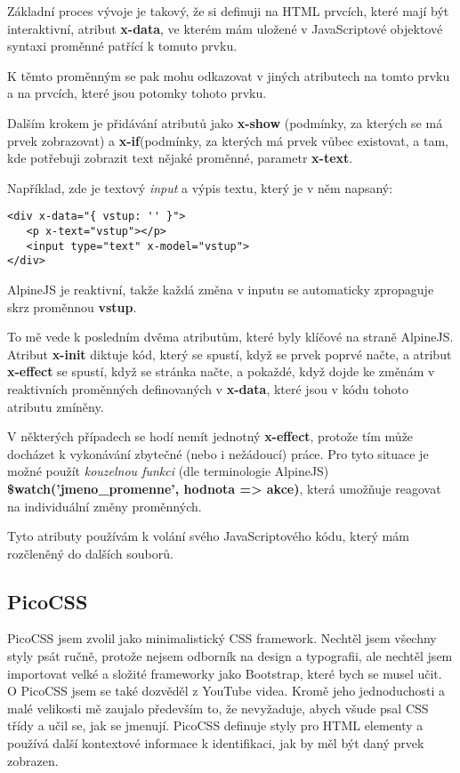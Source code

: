 \documentclass[11pt,a4paper,twoside,openright]{report}
\begin{document}
Základní proces vývoje je takový, že si definuji na HTML prvcích, které mají být interaktivní,
atribut \textbf{x-data}, ve kterém mám uložené v JavaScriptové objektové syntaxi proměnné patřící
k tomuto prvku.

K těmto proměnným se pak mohu odkazovat v jiných atributech na tomto prvku a na prvcích, které jsou
potomky tohoto prvku.

Dalším krokem je přidávání atributů jako \textbf{x-show} (podmínky, za kterých se má prvek zobrazovat)
a \textbf{x-if}(podmínky, za kterých má prvek vůbec existovat, a tam, kde potřebuji zobrazit text
nějaké proměnné, parametr \textbf{x-text}.

Například, zde je textový \emph{input} a výpis textu, který je v něm napsaný:

\begin{verbatim}
<div x-data="{ vstup: '' }">
   <p x-text="vstup"></p>
   <input type="text" x-model="vstup">
</div>
\end{verbatim}

AlpineJS je reaktivní, takže každá změna v inputu se automaticky zpropaguje skrz proměnnou \textbf{vstup}.

To mě vede k posledním dvěma atributům, které byly klíčové na straně AlpineJS. Atribut \textbf{x-init}
diktuje kód, který se spustí, když se prvek poprvé načte, a atribut \textbf{x-effect} se spustí, když
se stránka načte, a pokaždé, když dojde ke změnám v reaktivních proměnných definovaných v \textbf{x-data},
které jsou v kódu tohoto atributu zmíněny.

V některých případech se hodí nemít jednotný \textbf{x-effect}, protože tím může docházet k vykonávání
zbytečné (nebo i nežádoucí) práce. Pro tyto situace je možné použít \emph{kouzelnou funkci} (dle terminologie
AlpineJS) \textbf{\$watch('jmeno\_promenne', hodnota => akce)}, která umožňuje reagovat na individuální
změny proměnných.

Tyto atributy používám k volání svého JavaScriptového kódu, který mám rozčleněný do dalších souborů.

\subsection{PicoCSS}

PicoCSS jsem zvolil jako minimalistický CSS framework. Nechtěl jsem všechny styly psát ručně, protože
nejsem odborník na design a typografii, ale nechtěl jsem importovat velké a složité frameworky jako
Bootstrap, které bych se musel učit. O PicoCSS jsem se také dozvěděl z YouTube videa. Kromě jeho jednoduchosti
a malé velikosti mě zaujalo především to, že nevyžaduje, abych všude psal CSS třídy a učil se, jak se
jmenují. PicoCSS definuje styly pro HTML elementy a používá další kontextové informace k identifikaci,
jak by měl být daný prvek zobrazen.
\end{document}
